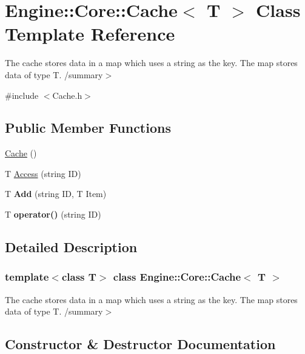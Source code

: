 \hypertarget{class_engine_1_1_core_1_1_cache}{}\section{Engine\+:\+:Core\+:\+:Cache$<$ T $>$ Class Template Reference}
\label{class_engine_1_1_core_1_1_cache}


The cache stores data in a map which uses a string as the key. The map stores data of type T. /summary$>$  




{\ttfamily \#include $<$Cache.\+h$>$}

\subsection*{Public Member Functions}
\begin{DoxyCompactItemize}
\item 
\hyperlink{class_engine_1_1_core_1_1_cache_a18673becad0012e4db441535744d8e0f}{Cache} ()
\item 
T \hyperlink{class_engine_1_1_core_1_1_cache_a1a4d83ac2cc8656acb5c99e4999e1551}{Access} (string ID)
\item 
\mbox{\label{class_engine_1_1_core_1_1_cache_aa9c31c77611ffd712133d233f374e3c5}} 
T {\bfseries Add} (string ID, T Item)
\item 
\mbox{\label{class_engine_1_1_core_1_1_cache_a29aacc1330978a6795feb5a51165ece6}} 
T {\bfseries operator()} (string ID)
\end{DoxyCompactItemize}


\subsection{Detailed Description}
\subsubsection*{template$<$class T$>$\newline
class Engine\+::\+Core\+::\+Cache$<$ T $>$}

The cache stores data in a map which uses a string as the key. The map stores data of type T. /summary$>$ 

\subsection{Constructor \& Destructor Documentation}
\mbox{\label{class_engine_1_1_core_1_1_cache_a18673becad0012e4db441535744d8e0f}} 
